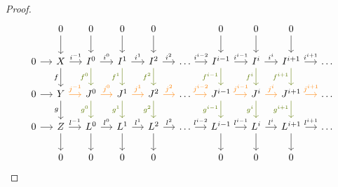 \begin{proof}{}
    \[\begin{tikzcd}[column sep=small]
        & 0 & 0 & 0 & 0 & & 0 & 0 & 0 & \\
        0 & X & {I^0} & {I^1} & {I^2} & \dots & {I^{i-1}} & {I^i} & {I^{i+1}} & \dots \\
        0 & Y & {J^0} & {J^1} & {J^2} & \dots & {J^{i-1}} & {J^i} & {J^{i+1}} & \dots \\
        0 & Z & {L^0} & {L^1} & {L^2} & \dots & {L^{i-1}} & {L^i} & {L^{i+1}} & \dots \\
        & 0 & 0 & 0 & 0 & & 0 & 0 & 0 &
        \arrow[from=1-2, to=2-2]
        \arrow[from=1-3, to=2-3]
        \arrow[from=1-4, to=2-4]
        \arrow[from=1-5, to=2-5]
        \arrow[from=1-7, to=2-7]
        \arrow[from=1-8, to=2-8]
        \arrow[from=1-9, to=2-9]
        \arrow[from=2-1, to=2-2]
        \arrow["{i^{-1}}", from=2-2, to=2-3]
        \arrow["{i^0}", from=2-3, to=2-4]
        \arrow["{i^1}", from=2-4, to=2-5]
        \arrow["{i^2}", from=2-5, to=2-6]
        \arrow["{i^{i-2}}", from=2-6, to=2-7]
        \arrow["{i^{i-1}}", from=2-7, to=2-8]
        \arrow["{i^i}", from=2-8, to=2-9]
        \arrow["{i^{i+1}}", from=2-9, to=2-10]
        \arrow["f"', from=2-2, to=3-2]
        \arrow["{f^0}"', color=applegreen, from=2-3, to=3-3]
        \arrow["{f^1}"', color=applegreen, from=2-4, to=3-4]
        \arrow["{f^2}"', color=applegreen, from=2-5, to=3-5]
        \arrow["{f^{i-1}}"', color=applegreen, from=2-7, to=3-7]
        \arrow["{f^i}"', color=applegreen, from=2-8, to=3-8]
        \arrow["{f^{i+1}}"', color=applegreen, from=2-9, to=3-9]
        \arrow[from=3-1, to=3-2]
        \arrow["{j^{-1}}", color=orange, from=3-2, to=3-3]
        \arrow["{j^0}", color=orange, from=3-3, to=3-4]
        \arrow["{j^1}", color=orange, from=3-4, to=3-5]
        \arrow["{j^2}", color=orange, from=3-5, to=3-6]
        \arrow["{j^{i-2}}", color=orange, from=3-6, to=3-7]
        \arrow["{j^{i-1}}", color=orange, from=3-7, to=3-8]
        \arrow["{j^i}", color=orange, from=3-8, to=3-9]
        \arrow["{j^{i+1}}", color=orange, from=3-9, to=3-10]
        \arrow["g"', from=3-2, to=4-2]
        \arrow["{g^0}"', color=applegreen, from=3-3, to=4-3]
        \arrow["{g^1}"', color=applegreen, from=3-4, to=4-4]
        \arrow["{g^2}"', color=applegreen, from=3-5, to=4-5]
        \arrow["{g^{i-1}}"', color=applegreen, from=3-7, to=4-7]
        \arrow["{g^i}"', color=applegreen, from=3-8, to=4-8]
        \arrow["{g^{i+1}}"', color=applegreen, from=3-9, to=4-9]
        \arrow[from=4-1, to=4-2]
        \arrow["{l^{-1}}", from=4-2, to=4-3]
        \arrow["{l^0}", from=4-3, to=4-4]
        \arrow["{l^1}", from=4-4, to=4-5]
        \arrow["{l^2}", from=4-5, to=4-6]
        \arrow["{l^{i-2}}", from=4-6, to=4-7]
        \arrow["{l^{i-1}}", from=4-7, to=4-8]
        \arrow["{l^i}", from=4-8, to=4-9]
        \arrow["{l^{i+1}}", from=4-9, to=4-10]
        \arrow[from=4-2, to=5-2]
        \arrow[from=4-3, to=5-3]
        \arrow[from=4-4, to=5-4]
        \arrow[from=4-5, to=5-5]
        \arrow[from=4-7, to=5-7]
        \arrow[from=4-8, to=5-8]
        \arrow[from=4-9, to=5-9]
    \end{tikzcd}\]


\end{proof}
